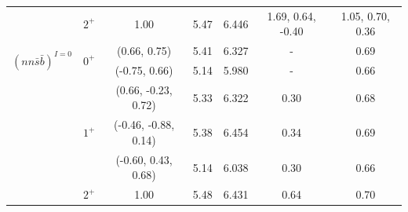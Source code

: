\documentclass[12pt,onecolumn,floatfix,nofootinbib]{revtex4}
\begin{document}
\begin{table}[!htb]
\begin{tabular}{ccccccc}
& $2^{+}$ & 1.00 & 5.47 & 6.446 & 1.69, 0.64, -0.40 & 1.05, 0.70, 0.36 \\
\multirow{2}{*}{${(nn\bar{s}\bar{b})}^{I=0}$} & \multirow{2}{*}{$0^{+}$} &
(0.66, 0.75) & 5.41 & 6.327 & - & 0.69 \\
&  & (-0.75, 0.66) & 5.14 & 5.980 & - & 0.66 \\
& \multirow{3}{*}{$1^{+}$} & (0.66, -0.23, 0.72) & 5.33 & 6.322 & 0.30 & 0.68 \\
&  & (-0.46, -0.88, 0.14) & 5.38 & 6.454 & 0.34 & 0.69 \\
&  & (-0.60, 0.43, 0.68) & 5.14 & 6.038 & 0.30 & 0.66 \\
& $2^{+}$ & 1.00 & 5.48 & 6.431 & 0.64 & 0.70 \\ \hline\hline
\end{tabular}%
\end{table}
\end{document}
